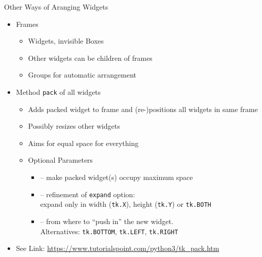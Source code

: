 \begin{frame}[fragile]{Other Ways of Aranging Widgets}
%
\begin{itemize}
\item Frames
	\begin{itemize}
	\item Widgets, invisible Boxes
	\item Other widgets can be children of frames
	\item Groups for automatic arrangement
	\end{itemize}
\item Method \texttt{pack} of all widgets
	\begin{itemize}
	\item Adds packed widget to frame and (re-)positions all widgets in same frame
	\item Possibly resizes other widgets
	\item Aims for equal space for everything
	\item Optional Parameters
		\begin{itemize}
		\item {} -- make packed widget(s) occupy maximum space
		\item {} -- refinement of \texttt{expand} option: \\
			expand only in width (\texttt{tk.X}), height (\texttt{tk.Y}) or \texttt{tk.BOTH}
		\item {} -- from where to \enquote{push in} the new widget.\\
			 Alternatives: \texttt{tk.BOTTOM}, \texttt{tk.LEFT}, \texttt{tk.RIGHT}
		\end{itemize}
	\end{itemize}
\item See Link: {\scriptsize \url{https://www.tutorialspoint.com/python3/tk_pack.htm}}
\end{itemize}
%
\end{frame}


